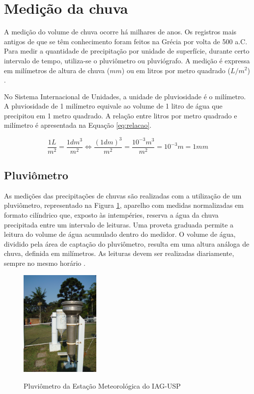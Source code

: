 \section{Medição da chuva}

A medição do volume de chuva ocorre há milhares de anos. Os registros mais antigos de que se têm conhecimento foram feitos na Grécia por volta de 500 a.C. Para medir a quantidade de precipitação por unidade de superfície, durante certo intervalo de tempo, utiliza-se o pluviômetro ou pluviógrafo. A medição é expressa em milímetros de altura de chuva ($mm$) ou em litros por metro quadrado ($L/m^2$) \cite{site-chuva}.

No Sistema Internacional de Unidades, a unidade de pluviosidade é o milímetro. A pluviosidade de 1 milímetro equivale ao volume de 1 litro de água que precipitou em 1 metro quadrado. A relação entre litros por metro quadrado e milímetro é apresentada na Equação \ref{eq:relacao}.

\begin{equation}
\label{eq:relacao}
    \frac{1L}{m^2} = \frac{1 dm^3}{m^2} \Longleftrightarrow\frac{(1 dm)^3}{m^2} = \frac{10^{-3}m^3}{m^2} = 10^{-3} m = 1mm
\end{equation}

\subsection{Pluviômetro}
As medições das precipitações de chuvas são realizadas com a utilização de um pluviômetro, representado na Figura \ref{fig:pluviometro}, aparelho com medidas normalizadas em formato cilíndrico que, exposto às intempéries, reserva a água da chuva precipitada entre um intervalo de leituras. Uma proveta graduada permite a leitura do volume de água acumulado dentro do medidor. O volume de água, dividido pela área de captação do pluviômetro, resulta em uma altura análoga de chuva, definida em milímetros. As leituras devem ser realizadas diariamente, sempre no mesmo horário \cite{manual-daee}.

\begin{figure}[h]
    \caption{Pluviômetro da Estação Meteorológica do IAG-USP}
    \centering
    \includegraphics[width=0.35\textwidth, keepaspectratio]{Textuais/Figuras/pluviometro.jpg}
    \label{fig:pluviometro}
\end{figure}


